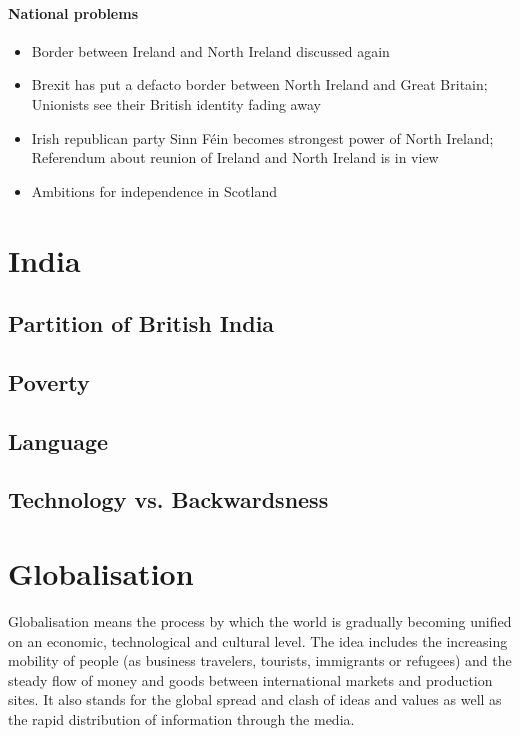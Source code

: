 \documentclass[10pt]{article}
\begin{document}
\paragraph{National problems}
\begin{itemize}
\item Border between Ireland and North Ireland discussed again 
\item Brexit has put a defacto border between North Ireland and Great Britain; Unionists  see their British identity fading away
\item Irish republican party Sinn Féin becomes strongest power of North Ireland; Referendum about reunion of Ireland and North Ireland is in view
\item Ambitions for independence in Scotland 
\end{itemize}

\section{India}
	\label{sec:india}
\subsection{Partition of British India}
	\label{ssec:india@britindia}
\subsection{Poverty}
	\label{ssec:india@poverty}
\subsection{Language}
	\label{ssec:india@language}
\subsection{Technology vs. Backwardsness}
	\label{ssec:india@tech}
\newpage
\section{Globalisation}
	\label{sec:global}
\begin{definition}
Globalisation means the process by which the world is gradually becoming unified
on an economic, technological and cultural level. The idea includes the increasing
mobility of people (as business travelers, tourists, immigrants or refugees) and the
steady flow of money and goods between international markets and production sites.
It also stands for the global spread and clash of ideas and values as well as the rapid
distribution of information through the media.
\end{definition}
\end{document}
